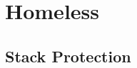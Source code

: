 \documentclass{article}
\begin{document}
\section{Homeless}

\subsection{Stack Protection}

\renewcommand{\TAG}[1]{\ensuremath{\textit{TAG}_{#1}}}
\newcommand{\TAGPC}{\ensuremath{\textit{TAG}_{PC}}}
\newcommand{\KERNEL}{\ensuremath{\textit{KERNEL}}}
\newcommand{\KERNELENTRY}{\ensuremath{\textit{KERNEL-ENTRY}}}
\newcommand{\STACK}{\ensuremath{\textit{STACK}}}
\newcommand{\STACKBASE}{\ensuremath{\textit{STACK-BASE}}}
\newcommand{\EMPTY}{\ensuremath{\textit{EMPTY}}}
\end{document}

